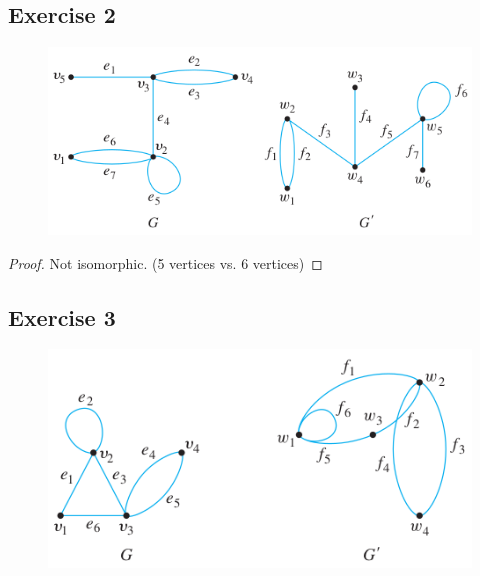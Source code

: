 \documentclass[14pt]{extarticle}
\begin{document}
\subsection{Exercise 2}
\begin{figure}[ht!]
\centering
\includegraphics[scale=0.55]{../images/10.3.2.png}
\end{figure}

\begin{proof}
Not isomorphic. (5 vertices vs. 6 vertices)
\end{proof}

\subsection{Exercise 3}
\begin{figure}[ht!]
\centering
\includegraphics[scale=0.55]{../images/10.3.3.png}
\end{figure}
\end{document}
